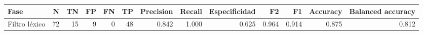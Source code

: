 \begin{tabular}{lrrrrrrrrrrrr}
\toprule
Fase & N & TN & FP & FN & TP & Precision & Recall & Especificidad & F2 & F1 & Accuracy & Balanced accuracy \\
\midrule
Filtro léxico & 72 & 15 & 9 & 0 & 48 & 0.842 & 1.000 & 0.625 & 0.964 & 0.914 & 0.875 & 0.812 \\
\bottomrule
\end{tabular}
